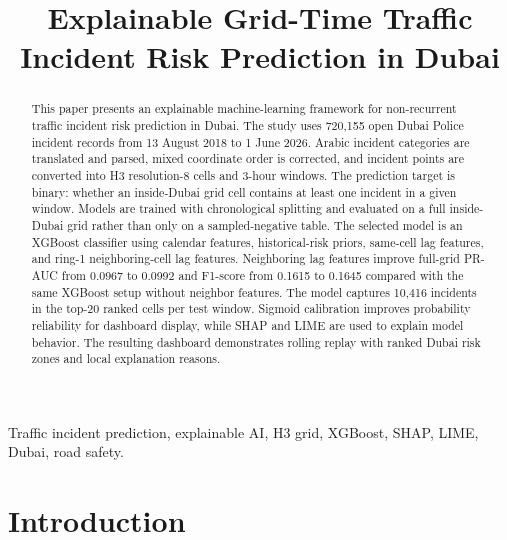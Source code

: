 \documentclass[conference]{IEEEtran}
\begin{document}
\title{Explainable Grid-Time Traffic Incident Risk Prediction in Dubai}

\author{
\and
{}
}

\maketitle

\begin{abstract}
This paper presents an explainable machine-learning framework for non-recurrent traffic incident risk prediction in Dubai. The study uses 720,155 open Dubai Police incident records from 13 August 2018 to 1 June 2026. Arabic incident categories are translated and parsed, mixed coordinate order is corrected, and incident points are converted into H3 resolution-8 cells and 3-hour windows. The prediction target is binary: whether an inside-Dubai grid cell contains at least one incident in a given window. Models are trained with chronological splitting and evaluated on a full inside-Dubai grid rather than only on a sampled-negative table. The selected model is an XGBoost classifier using calendar features, historical-risk priors, same-cell lag features, and ring-1 neighboring-cell lag features. Neighboring lag features improve full-grid PR-AUC from 0.0967 to 0.0992 and F1-score from 0.1615 to 0.1645 compared with the same XGBoost setup without neighbor features. The model captures 10,416 incidents in the top-20 ranked cells per test window. Sigmoid calibration improves probability reliability for dashboard display, while SHAP and LIME are used to explain model behavior. The resulting dashboard demonstrates rolling replay with ranked Dubai risk zones and local explanation reasons.
\end{abstract}

\begin{IEEEkeywords}
Traffic incident prediction, explainable AI, H3 grid, XGBoost, SHAP, LIME, Dubai, road safety.
\end{IEEEkeywords}

\section{Introduction}
\end{document}
